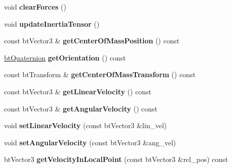 \begin{DoxyCompactItemize}
\item 
\hypertarget{classbt_rigid_body_a1ffe77aaa4d3712457aa8f9aa83f42a7}{void {\bfseries clear\+Forces} ()}\label{classbt_rigid_body_a1ffe77aaa4d3712457aa8f9aa83f42a7}

\item 
\hypertarget{classbt_rigid_body_aeb2880f17187c3f28b4a253423aa71d1}{void {\bfseries update\+Inertia\+Tensor} ()}\label{classbt_rigid_body_aeb2880f17187c3f28b4a253423aa71d1}

\item 
\hypertarget{classbt_rigid_body_ad87d0db677fd8f074178d993f0ff1c42}{const bt\+Vector3 \& {\bfseries get\+Center\+Of\+Mass\+Position} () const }\label{classbt_rigid_body_ad87d0db677fd8f074178d993f0ff1c42}

\item 
\hypertarget{classbt_rigid_body_a2bb57646e4a3e2a67ecd0e55d23cdad5}{\hyperlink{classbt_quaternion}{bt\+Quaternion} {\bfseries get\+Orientation} () const }\label{classbt_rigid_body_a2bb57646e4a3e2a67ecd0e55d23cdad5}

\item 
\hypertarget{classbt_rigid_body_a5eaee89e89e7498cfb39709e58fdc477}{const bt\+Transform \& {\bfseries get\+Center\+Of\+Mass\+Transform} () const }\label{classbt_rigid_body_a5eaee89e89e7498cfb39709e58fdc477}

\item 
\hypertarget{classbt_rigid_body_ad04b979396367f3f1945cebff4933252}{const bt\+Vector3 \& {\bfseries get\+Linear\+Velocity} () const }\label{classbt_rigid_body_ad04b979396367f3f1945cebff4933252}

\item 
\hypertarget{classbt_rigid_body_adc19d8e39a18aeabfb04be61de2c984e}{const bt\+Vector3 \& {\bfseries get\+Angular\+Velocity} () const }\label{classbt_rigid_body_adc19d8e39a18aeabfb04be61de2c984e}

\item 
\hypertarget{classbt_rigid_body_ad692042edc901425189cf1d067eebac6}{void {\bfseries set\+Linear\+Velocity} (const bt\+Vector3 \&lin\+\_\+vel)}\label{classbt_rigid_body_ad692042edc901425189cf1d067eebac6}

\item 
\hypertarget{classbt_rigid_body_ac6e5f94e998150e37ca8962c851d10a8}{void {\bfseries set\+Angular\+Velocity} (const bt\+Vector3 \&ang\+\_\+vel)}\label{classbt_rigid_body_ac6e5f94e998150e37ca8962c851d10a8}

\item 
\hypertarget{classbt_rigid_body_a78f7293894bf0652a1e740ee63bf1eed}{bt\+Vector3 {\bfseries get\+Velocity\+In\+Local\+Point} (const bt\+Vector3 \&rel\+\_\+pos) const }\label{classbt_rigid_body_a78f7293894bf0652a1e740ee63bf1eed}


\end{DoxyCompactItemize}
